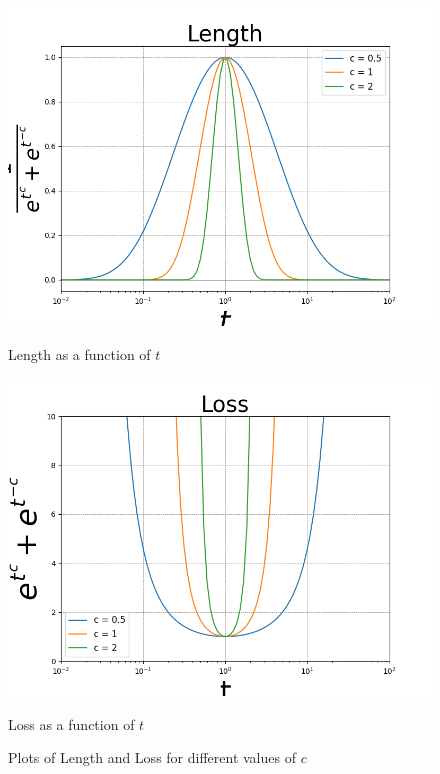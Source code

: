 \begin{figure}[htbp]
    \centering
    \begin{minipage}{0.49\textwidth}
        \centering
        \includegraphics[width=\textwidth]{../figures/Figure_1a.png}
        \caption{Length as a function of $t$}
        \label{fig:length}
    \end{minipage}
    \hfill
    \begin{minipage}{0.49\textwidth}
        \centering
        \includegraphics[width=\textwidth]{../figures/Figure_1b.png}
        \caption{Loss as a function of $t$}
        \label{fig:loss}
    \end{minipage}
    \caption{Plots of Length and Loss for different values of $c$}
    \label{fig:results}
\end{figure}


